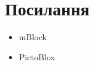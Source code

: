\documentclass[oneside, final]{article}
\begin{document}
\section{Посилання}
\begin{itemize}
	\item mBlock 
	\item PictoBlox 
\end{itemize}
\end{document}
